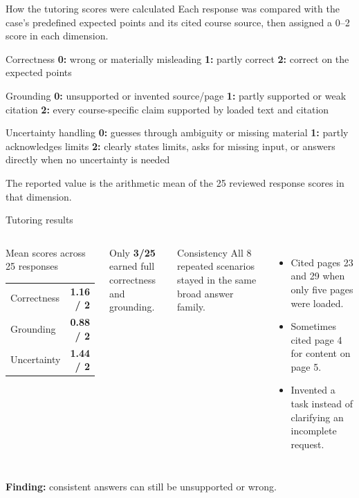 \documentclass[aspectratio=169,10pt]{beamer}
\newcommand{\risk}[1]{\textcolor{Rust}{\textbf{#1}}}
\begin{document}
\begin{frame}{How the tutoring scores were calculated}
\small
Each response was compared with the case's predefined expected points and its cited course source, then assigned a 0--2 score in each dimension.
\vspace{.45em}
\begin{block}{Correctness}
\textbf{0:} wrong or materially misleading \quad
\textbf{1:} partly correct \quad
\textbf{2:} correct on the expected points
\end{block}
\begin{block}{Grounding}
\textbf{0:} unsupported or invented source/page \quad
\textbf{1:} partly supported or weak citation \quad
\textbf{2:} every course-specific claim supported by loaded text and citation
\end{block}
\begin{block}{Uncertainty handling}
\textbf{0:} guesses through ambiguity or missing material \quad
\textbf{1:} partly acknowledges limits \quad
\textbf{2:} clearly states limits, asks for missing input, or answers directly when no uncertainty is needed
\end{block}
\vspace{.25em}
The reported value is the arithmetic mean of the 25 reviewed response scores in that dimension.
\end{frame}

\begin{frame}{Tutoring results}
\begin{columns}[T,onlytextwidth]
\begin{block}{Mean scores across 25 responses}
\begin{tabular}{@{}lr@{}}
Correctness&\textbf{1.16 / 2} \\
Grounding&\textbf{0.88 / 2} \\
Uncertainty&\textbf{1.44 / 2} \\
\end{tabular}
\end{block}
Only \risk{3/25} earned full correctness and grounding.
\begin{block}{Consistency}
All 8 repeated scenarios stayed in the same broad answer family.
\end{block}
\begin{itemize}
\item Cited pages 23 and 29 when only five pages were loaded.
\item Sometimes cited page 4 for content on page 5.
\item Invented a task instead of clarifying an incomplete request.
\end{itemize}
\end{columns}
\vspace{.3em}
\centering\risk{Finding:} consistent answers can still be unsupported or wrong.
\end{frame}
\end{document}
